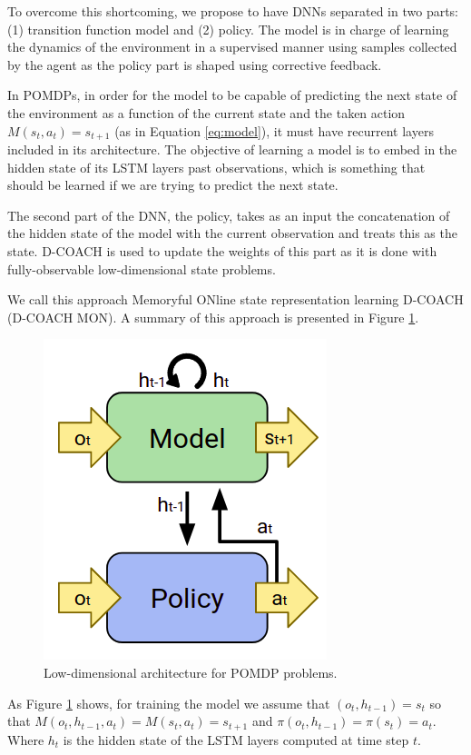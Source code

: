 To overcome this shortcoming, we propose to have DNNs separated in two parts: (1) transition function model and (2) policy. The model is in charge of learning the dynamics of the environment in a supervised manner using samples collected by the agent as the policy part is shaped using corrective feedback. 

In POMDPs, in order for the model to be capable of predicting the next state of the environment as a function of the current state and the taken action $M(s_{t},a_{t}) = s_{t+1}$ (as in Equation \ref{eq:model}), it must have recurrent layers included in its architecture. The objective of learning a model is to embed in the hidden state of its LSTM layers past observations, which is something that should be learned if we are trying to predict the next state. 

The second part of the DNN, the policy, takes as an input the concatenation of the hidden state of the model with the current observation and treats this as the state. D-COACH is used to update the weights of this part as it is done with fully-observable low-dimensional state problems.

We call this approach Memoryful ONline state representation learning D-COACH (D-COACH MON). A summary of this approach is presented in Figure \ref{fig:mb_dcoach}.

\begin{figure}[h]
    \centering
    \includegraphics[width=0.4\linewidth]{imagenes/cap4/model_based_dcoach.png}
    \caption{Low-dimensional architecture for POMDP problems.}
    \label{fig:mb_dcoach}
\end{figure}

As Figure \ref{fig:mb_dcoach} shows, for training the model we assume that $(o_{t}, h_{t-1}) = s_{t}$ so that $M(o_{t}, h_{t-1},a_{t}) =M(s_{t},a_{t}) = s_{t+1}$ and $\pi(o_{t}, h_{t-1})=\pi(s_{t})=a_{t}$. Where $h_{t}$ is the hidden state of the LSTM layers computed at time step $t$.

